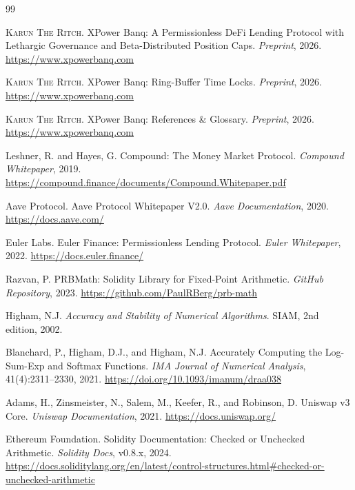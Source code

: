 \documentclass[10pt,a4paper,twocolumn]{article}
\begin{document}
\ifbundle\else
\begin{thebibliography}{99}

\textsc{Karun The Ritch}.
\newblock XPower Banq: A Permissionless DeFi Lending Protocol with Lethargic Governance and Beta-Distributed Position Caps.
\newblock \emph{Preprint}, 2026.
\newblock \url{https://www.xpowerbanq.com}

\textsc{Karun The Ritch}.
\newblock XPower Banq: Ring-Buffer Time Locks.
\newblock \emph{Preprint}, 2026.
\newblock \url{https://www.xpowerbanq.com}

\textsc{Karun The Ritch}.
\newblock XPower Banq: References \& Glossary.
\newblock \emph{Preprint}, 2026.
\newblock \url{https://www.xpowerbanq.com}

Leshner, R. and Hayes, G.
\newblock Compound: The Money Market Protocol.
\newblock \emph{Compound Whitepaper}, 2019.
\newblock \url{https://compound.finance/documents/Compound.Whitepaper.pdf}

Aave Protocol.
\newblock Aave Protocol Whitepaper V2.0.
\newblock \emph{Aave Documentation}, 2020.
\newblock \url{https://docs.aave.com/}

Euler Labs.
\newblock Euler Finance: Permissionless Lending Protocol.
\newblock \emph{Euler Whitepaper}, 2022.
\newblock \url{https://docs.euler.finance/}

Razvan, P.
\newblock PRBMath: Solidity Library for Fixed-Point Arithmetic.
\newblock \emph{GitHub Repository}, 2023.
\newblock \url{https://github.com/PaulRBerg/prb-math}

Higham, N.J.
\newblock \emph{Accuracy and Stability of Numerical Algorithms}.
\newblock SIAM, 2nd edition, 2002.

Blanchard, P., Higham, D.J., and Higham, N.J.
\newblock Accurately Computing the Log-Sum-Exp and Softmax Functions.
\newblock \emph{IMA Journal of Numerical Analysis}, 41(4):2311--2330, 2021.
\newblock \url{https://doi.org/10.1093/imanum/draa038}

Adams, H., Zinsmeister, N., Salem, M., Keefer, R., and Robinson, D.
\newblock Uniswap v3 Core.
\newblock \emph{Uniswap Documentation}, 2021.
\newblock \url{https://docs.uniswap.org/}

Ethereum Foundation.
\newblock Solidity Documentation: Checked or Unchecked Arithmetic.
\newblock \emph{Solidity Docs}, v0.8.x, 2024.
\newblock \url{https://docs.soliditylang.org/en/latest/control-structures.html#checked-or-unchecked-arithmetic}

\end{thebibliography}
\fi
\end{document}
